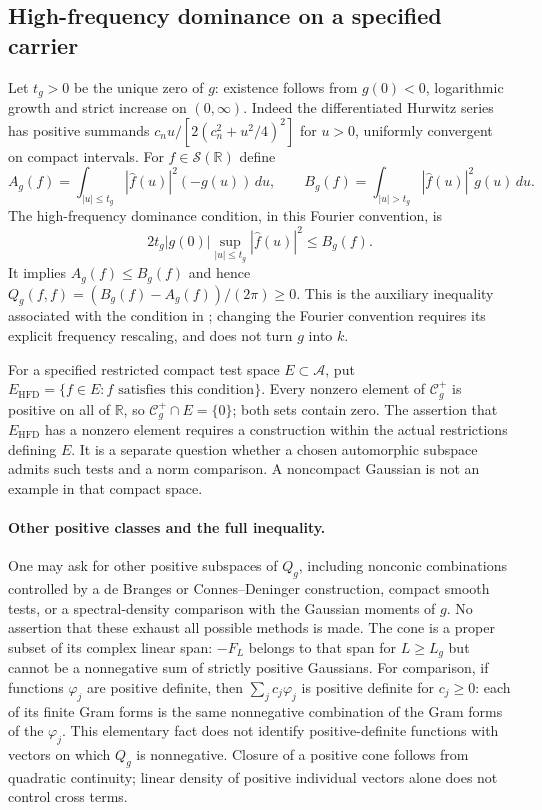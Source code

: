 \subsection{High-frequency dominance on a specified carrier}
\label{v4-arith:pres74:hfd}
Let $t_g>0$ be the unique zero of $g$: existence follows from
$g(0)<0$, logarithmic growth and strict increase on $(0,\infty)$.
Indeed the differentiated Hurwitz series has positive summands
$c_nu/[2(c_n^2+u^2/4)^2]$ for $u>0$, uniformly convergent on compact
intervals. For $f\in\mathcal S(\mathbb R)$ define
\[
 A_g(f)=\int_{|u|\le t_g}|\widehat f(u)|^2(-g(u))\,du,\qquad
 B_g(f)=\int_{|u|>t_g}|\widehat f(u)|^2g(u)\,du.
\]
The high-frequency dominance condition, in this Fourier convention, is
\[
 2t_g|g(0)|\sup_{|u|\le t_g}|\widehat f(u)|^2\le B_g(f).
\]
It implies $A_g(f)\le B_g(f)$ and hence
$Q_g(f,f)=(B_g(f)-A_g(f))/(2\pi)\ge0$.
This is the auxiliary inequality associated with the condition in
; changing the Fourier convention
requires its explicit frequency rescaling, and does not turn $g$ into $k$.

For a specified restricted compact test space $E\subset\mathscr A$,
put $E_{\mathrm{HFD}}=\{f\in E:f\text{ satisfies this condition}\}$.
Every nonzero element of $\mathcal C_g^+$ is positive on all of
$\mathbb R$, so $\mathcal C_g^+\cap E=\{0\}$; both sets contain zero.
The assertion that $E_{\mathrm{HFD}}$ has a nonzero element requires
a construction within the actual restrictions defining $E$.
It is a separate question whether a chosen automorphic subspace
admits such tests and a norm comparison. A noncompact Gaussian is
not an example in that compact space.

\paragraph{Other positive classes and the full inequality.}
\label{v4-arith:pres74:routes}
One may ask for other positive subspaces of $Q_g$, including
nonconic combinations controlled by a de Branges or Connes--Deninger
construction, compact smooth tests, or a spectral-density comparison
with the Gaussian moments of $g$. No assertion that these exhaust
all possible methods is made. The cone is a proper subset of its
complex linear span: $-F_L$ belongs to that span for $L\ge L_g$
but cannot be a nonnegative sum of strictly positive Gaussians.
For comparison, if functions $\varphi_j$ are positive definite,
then $\sum_jc_j\varphi_j$ is positive definite for $c_j\ge0$:
each of its finite Gram forms is the same nonnegative combination
of the Gram forms of the $\varphi_j$. This elementary fact does
not identify positive-definite functions with vectors on which
$Q_g$ is nonnegative. Closure of a positive cone follows
from quadratic continuity; linear density of positive individual
vectors alone does not control cross terms.

